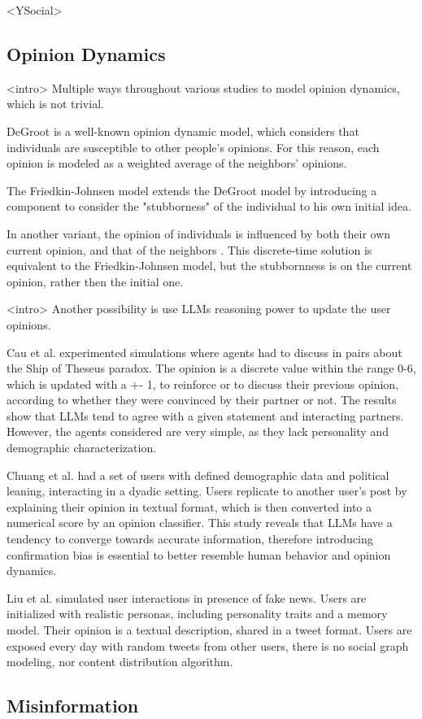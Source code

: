 <YSocial>












\subsection{Opinion Dynamics}
<intro> Multiple ways throughout various studies to model opinion dynamics, which is not trivial.

DeGroot is a well-known opinion dynamic model, which considers that individuals are susceptible to other people's opinions. For this reason, each opinion is modeled as a weighted average of the neighbors' opinions.

The Friedkin-Johnsen model \cite{article} extends the DeGroot model by introducing a component to consider the "stubborness" of the individual to his own initial idea. 

In another variant, the opinion of individuals is influenced by both their own current opinion, and that of the neighbors \cite{Ye2018Opinion, Liu_2018}. This discrete-time solution is equivalent to the Friedkin-Johnsen model, but the stubbornness is on the current opinion, rather then the initial one.


<intro> Another possibility is use LLMs reasoning power to update the user opinions.

Cau et al. \cite{cau2025languagedrivenopiniondynamicsagentbased} experimented simulations where agents had to discuss in pairs about the Ship of Theseus paradox.
The opinion is a discrete value within the range 0-6, which is updated with a +- 1,  to reinforce or to discuss their previous opinion, according to whether they were convinced by their partner or not.
The results show that LLMs tend to agree with a given statement and interacting partners. However, the agents considered are very simple, as they lack personality and demographic characterization.

Chuang et al. \cite{chuang2024simulatingopiniondynamicsnetworks} had a set of users with defined demographic data and political leaning, interacting in a dyadic setting. Users replicate to another user's post by explaining their opinion in textual format, which is then converted into a numerical score by an opinion classifier.
This study reveals that LLMs have a tendency to converge towards accurate information, therefore introducing confirmation bias is essential to better resemble human behavior and opinion dynamics.

Liu et al. \cite{Liu_2024} simulated user interactions in presence of fake news. Users are initialized with realistic personas, including personality traits and a memory model. Their opinion is a textual description, shared in a tweet format. 
Users are exposed every day with random tweets from other users, there is no social graph modeling, nor content distribution algorithm.

\subsection{Misinformation}